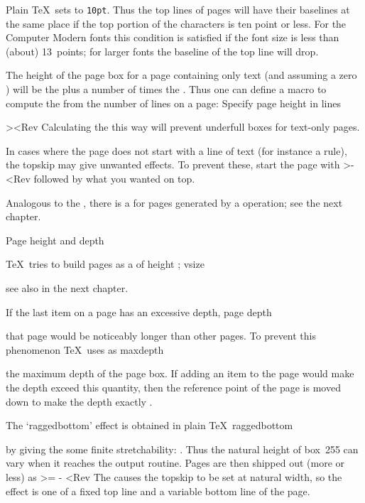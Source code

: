 Plain \TeX\ sets  to {\tt 10pt}.
Thus the top lines of pages will have their baselines
at the same place if
the top portion of the characters is ten point or less.
For the Computer Modern fonts this condition is satisfied
if the font size is less than (about) 13~points; 
for larger fonts
the baseline of the top line will drop.

The height of the page box for a page containing only
text (and assuming a zero )
will be the  plus a number of times
the . Thus one can define a macro
to compute the  from the number of lines
on a page:
\howto Specify page height in lines\par
\Ver>\def\HeightInLines#1{\count@=#1\relax
    \advance\count@ by -1\relax
    \vsize=\baselineskip
    \multiply\vsize by \count@
    \advance\vsize by \topskip}<Rev
Calculating the  this way will prevent
underfull boxes for text-only pages.

In cases where the page does not start with a line of text
(for instance a rule), the topskip may give unwanted effects.
To prevent these, start the page with
\Ver>\hbox{}\kern-\topskip<Rev
followed by what you wanted on top. 

Analogous to the , there is a 
for pages generated by a  operation; see
the next chapter.

\point Page height and depth

\TeX\ tries to build pages as a  of height ;
\alt
\csterm vsize\par
see also  in the next chapter.

If the last item on a page has an excessive depth,
\term page depth\par
that page would be noticeably longer than other pages.
To prevent this phenomenon \TeX\ uses  as
\csterm maxdepth\par
the maximum depth of the page box. If adding an item to the
page would make the depth exceed this quantity, then the
reference point of the page is moved down to make the depth
exactly .

The `raggedbottom' effect is obtained in plain \TeX\
\csterm raggedbottom\par
by giving the  some finite stretchability:
\hbox{}.
Thus the natural height of box~255 can vary when it reaches
the output routine.
Pages are then shipped out (more or less) as
\Ver>= 
\ifraggedbottom \kern-\dimen0 \vfil \fi <Rev
The  causes the topskip to be set at natural
width, so the effect is one of a fixed top line  and a
variable bottom line of the page.

